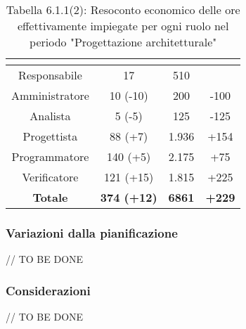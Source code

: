 \renewcommand{\arraystretch}{1.4}
\begin{table}[H]
\begin{center}
\begin{tabular}{|c|c|c|c|}
\hline
\rowcolor{title_row}
\textbf{\color{title_text}{Ruolo}}  & \textbf{\color{title_text}{Ore}} & \textbf{\color{title_text}{Costo in \euro}} & \textbf{\color{title_text}{Differenza al preventivo in \euro}} \\ \hline
Responsabile    & 17 & 510 & \\  \hline
Amministratore  & 10 (-10)& 200 & -100 \\ \hline
Analista        & 5 (-5) & 125 & -125 \\ \hline
Progettista     & 88 (+7) & 1.936 & +154\\ \hline
Programmatore   & 140 (+5) & 2.175 & +75\\ \hline
Verificatore    & 121 (+15) & 1.815& +225\\ \hline
\textbf{Totale} & \textbf{374 (+12)}    & \textbf{6861} & \textbf{+229} \\ \hline
\end{tabular}
\caption{Tabella 6.1.1(2): Resoconto economico delle ore effettivamente impiegate per ogni ruolo nel periodo "Progettazione architetturale"\label{}}
\end{center}
\end{table}
\renewcommand{\arraystretch}{1}


\subsubsection{Variazioni dalla pianificazione}
// TO BE DONE

\subsubsection{Considerazioni}
// TO BE DONE
\pagebreak
